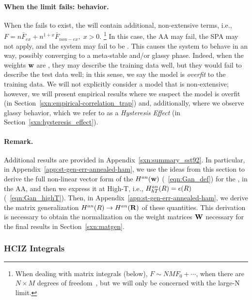 \paragraph{When the limit fails: \ATypical behavior.}
When the \ThermodynamicLimit fails to exist, the \FreeEnergy will contain additional, non-extensive terms, i.e.,
$F = n\bar{F}_{ex} + n^{1+x}\bar{F}_{non-ex},\;x>0$.
\footnote{When dealing with matrix integrals (below), $F\sim NMF_{0}+\cdots$, when there are $N \times M$ degrees
of freedom~\cite{PP95}, but we will only be concerned with the large-N limit.}
In this case, the AA may fail, the SPA may not apply, and the system may fail to be \SelfAveraging.
This causes the system to behave in an \ATypical way, 
possibly converging to a meta-stable and/or glassy phase.
Indeed, when the weights ${\mathbf{w}}$ are \emph{\ATypical}, they may describe the training data well, 
but they would fail to describe the test data well; in this sense, we say the model is \emph{overfit} to the training data.
We will not explicitly consider a model that is non-extensive; however, we will
present empirical results where we suspect the model is overfit
(in Section~\ref{sxn:empirical-correlation_trap})
and, additionally, where we observe glassy behavior, which we refer to as a \emph{Hysteresis Effect}
(in Section~\ref{sxn:hysteresis_effect}).



\paragraph{Remark.} 
Additional results are provided in Appendix~\ref{sxn:summary_sst92}.
In particular, in Appendix~\ref{app:st-gen-err-annealed-ham}, we use the ideas from this section to derive the full non-linear vector form of the \AnnealedHamiltonian $H^{an}({\mathbf{w}})$ (\EQN~\ref{eqn:Gan_def})
for the \LinearPerceptron, in the AA, and then we express it at High-T, i.e.,
$H^{an}_{hT}(R)=\epsilon(R)$ (\EQN~\ref{eqn:Gan_highT}).  
Then, in Appendix~\ref{app:st-gen-err-annealed-ham}, we derive the matrix generalization
$H^{an}(R)\rightarrow H^{an}(\mathbf{R})$ of these quantities.
This derivation is necessary to obtain the normalization on the weight matrices ${\mathbf{W}}$ necessary for the final results in Section~\ref{sxn:matgen}.


\subsubsection{HCIZ Integrals}
\label{sxn:mathP_hciz}

